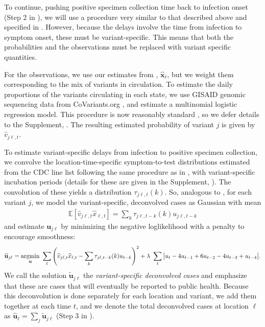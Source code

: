 To continue, pushing positive specimen collection time back to infection onset
(Step 2 in ), we will use a procedure very
similar to that described above and specified in
. However, because
the delays involve the time from infection to symptom onset, these must be
variant-specific. This means that both the probabilities and the observations
must be replaced with variant specific quantities. 

For the observations, we use our estimates from ,
$\widehat{\mathbf{x}}_\ell$, but we weight them corresponding to the mix of
variants in circulation. To estimate the daily proportions of the variants
circulating in each state, we use GISAID genomic sequencing data from
CoVariants.org \citep{hodcroft2021covariants, elbe2017data}, and estimate a
multinomial logistic regression model. This procedure is now reasonably standard
\citep{obermeyer2022analysis, annavajhala2021emergence, figgins2021sars}, so we
defer details to the Supplement, . The resulting
estimated probability of variant $j$ is given by $\hat{v}_{j\ell,t}$.

To estimate variant-specific delays from infection to positive specimen
collection, we convolve the location-time-specific symptom-to-test distributions
estimated from the CDC line list following the same procedure as in
, with variant-specific incubation periods (details for these
are given in the Supplement, ).  The convolution of these
yields a distribution $\tau_{j\ell,t}(k)$. So, analogous to
, for each variant $j$, we model
the variant-specific, deconvolved cases as Gaussian with mean
\begin{align}
  \mathbb{E}\left[\widehat{v}_{j\ell,t}\widehat{x}_{\ell,t}\right] = \sum_k \tau_{j\ell,t-k}(k) u_{j\ell,t-k} 
\end{align}
and estimate $\mathbf{u}_{j\ell}$ by minimizing the negative loglikelihood with
a penalty to encourage smoothness:
\begin{align}
\widetilde{\mathbf{u}}_{j\ell} = \operatorname*{argmin}_{\mathbf{u}}\ \sum_{t} 
\left( 
    \widehat{v}_{j\ell,t} \widehat{x}_{\ell,t} -  
    \sum_k \tau_{j\ell,t-k}(k) u_{t-k} 
\right)^2 
+ \lambda\ \sum_{t} \big|u_{t} - 4u_{t-1} + 6u_{t-2} -4u_{t-3}+ u_{t-4}\big|.
\end{align}
We call the solution $\widetilde{\mathbf{u}}_{j\ell}$ the \emph{variant-specific
deconvolved cases} and emphasize that these are cases that will eventually
be reported to public health. Because this deconvolution is done separately for
each location and variant, we add them together at each time $t$, and
we denote the total deconvolved cases at location $\ell$ as
$\widehat{\mathbf{u}}_\ell = \sum_j \widetilde{\mathbf{u}}_{j\ell}$ (Step 3 in ). 




